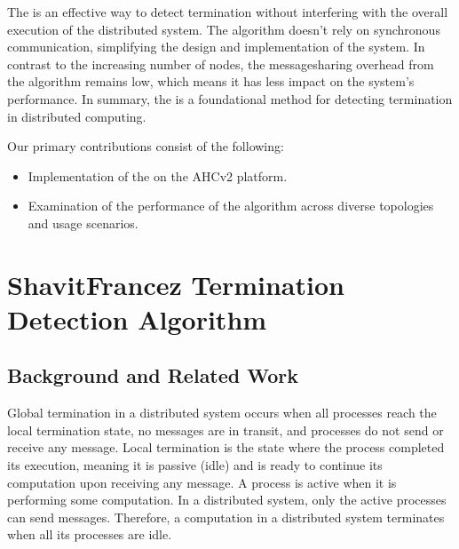 \documentclass[letterpaper,10pt,english]{sphinxmanual}
\begin{document}
\sphinxAtStartPar
The {\hyperref[\detokenize{docs/ShavitFrancez/algorithm:shavitfrancezterminationdetectionalgorithm}]{}} is an effective way to detect termination without interfering with the overall execution of the distributed system. The algorithm doesn’t rely on synchronous communication, simplifying the design and implementation of the system. In contrast to the increasing number of nodes, the message\sphinxhyphen{}sharing overhead from the algorithm remains low, which means it has less impact on the system’s performance. In summary, the {\hyperref[\detokenize{docs/ShavitFrancez/algorithm:shavitfrancezterminationdetectionalgorithm}]{}} is a foundational method for detecting termination in distributed computing.

\sphinxAtStartPar
Our primary contributions consist of the following:
\begin{itemize}
\item {} 
\sphinxAtStartPar
Implementation of the {\hyperref[\detokenize{docs/ShavitFrancez/algorithm:shavitfrancezterminationdetectionalgorithm}]{}} on the AHCv2 platform.

\item {} 
\sphinxAtStartPar
Examination of the performance of the algorithm across diverse topologies and usage scenarios.

\end{itemize}

\sphinxstepscope


\section{Shavit\sphinxhyphen{}Francez Termination Detection Algorithm}
\label{\detokenize{docs/ShavitFrancez/algorithm:shavitfrancezalg}}\label{\detokenize{docs/ShavitFrancez/algorithm::doc}}

\subsection{Background and Related Work}
\label{\detokenize{docs/ShavitFrancez/algorithm:background-and-related-work}}
\sphinxAtStartPar
Global termination in a distributed system occurs when all processes reach the local termination state, no messages are in transit, and processes do not send or receive any message. Local termination is the state where the process completed its execution, meaning it is passive (idle) and is ready to continue its computation upon receiving any message. A process is active when it is performing some computation. In a distributed system, only the active processes can send messages. Therefore, a computation in a distributed system terminates when all its processes are idle.
\end{document}
